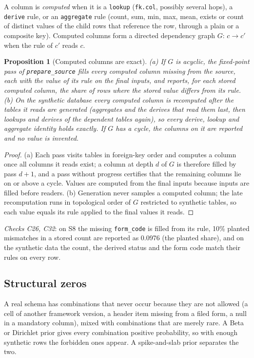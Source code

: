 \documentclass[11pt,a4paper]{article}
\newtheorem{proposition}{Proposition}
\theoremstyle{definition}
\theoremstyle{remark}
\begin{document}
A column is \emph{computed} when it is a \texttt{lookup} (\texttt{fk.col}, possibly several hops), a \texttt{derive} rule, or an \texttt{aggregate} rule (count, sum, min, max, mean, exists or count of distinct values of the child rows that reference the row, through a plain or a composite key). Computed columns form a directed dependency graph $G$: $c\to c'$ when the rule of $c'$ reads $c$.
\begin{proposition}[Computed columns are exact]\label{prop:computed}
(a) If $G$ is acyclic, the fixed-point pass of \texttt{prepare\_source} fills every computed column missing from the source, each with the value of its rule on the final inputs, and reports, for each stored computed column, the share of rows where the stored value differs from its rule. (b) On the synthetic database every computed column is recomputed after the tables it reads are generated (aggregates and the derives that read them last, then lookups and derives of the dependent tables again), so every derive, lookup and aggregate identity holds exactly. If $G$ has a cycle, the columns on it are reported and no value is invented.
\end{proposition}
\begin{proof}
(a) Each pass visits tables in foreign-key order and computes a column once all columns it reads exist; a column at depth $d$ of $G$ is therefore filled by pass $d+1$, and a pass without progress certifies that the remaining columns lie on or above a cycle. Values are computed from the final inputs because inputs are filled before readers. (b) Generation never samples a computed column; the late recomputation runs in topological order of $G$ restricted to synthetic tables, so each value equals its rule applied to the final values it reads.
\end{proof}
\noindent\emph{Checks C26, C32}: on S8 the missing \texttt{form\_code} is filled from its rule, 10\% planted mismatches in a stored count are reported as 0.0976 (the planted share), and on the synthetic data the count, the derived status and the form code match their rules on every row.

\subsection{Structural zeros}
A real schema has combinations that never occur because they are not allowed (a cell of another framework version, a header item missing from a filed form, a null in a mandatory column), mixed with combinations that are merely rare. A Beta or Dirichlet prior gives every combination positive probability, so with enough synthetic rows the forbidden ones appear. A spike-and-slab prior separates the two.
\end{document}
